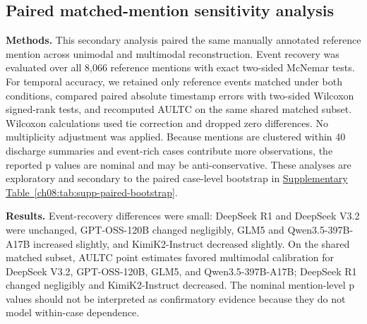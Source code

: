 \FloatBarrier
\subsection{Paired matched-mention sensitivity analysis}\label{ch08:supp:matched-mention}
\noindent
\textbf{Methods.} This secondary analysis paired the same manually annotated reference mention across unimodal and multimodal reconstruction. Event recovery was evaluated over all 8,066 reference mentions with exact two-sided McNemar tests. For temporal accuracy, we retained only reference events matched under both conditions, compared paired absolute timestamp errors with two-sided Wilcoxon signed-rank tests, and recomputed AULTC on the same shared matched subset. Wilcoxon calculations used tie correction and dropped zero differences. No multiplicity adjustment was applied. Because mentions are clustered within 40 discharge summaries and event-rich cases contribute more observations, the reported p values are nominal and may be anti-conservative. These analyses are exploratory and secondary to the paired case-level bootstrap in \hyperref[ch08:tab:supp-paired-bootstrap]{Supplementary Table~\ref*{ch08:tab:supp-paired-bootstrap}}.

\noindent
\textbf{Results.} Event-recovery differences were small: DeepSeek R1 and DeepSeek V3.2 were unchanged, GPT-OSS-120B changed negligibly, GLM5 and Qwen3.5-397B-A17B increased slightly, and KimiK2-Instruct decreased slightly. On the shared matched subset, AULTC point estimates favored multimodal calibration for DeepSeek V3.2, GPT-OSS-120B, GLM5, and Qwen3.5-397B-A17B; DeepSeek R1 changed negligibly and KimiK2-Instruct decreased. The nominal mention-level p values should not be interpreted as confirmatory evidence because they do not model within-case dependence.

\par\medskip
\noindent

\par\medskip

\par\medskip
\noindent

\par\medskip

